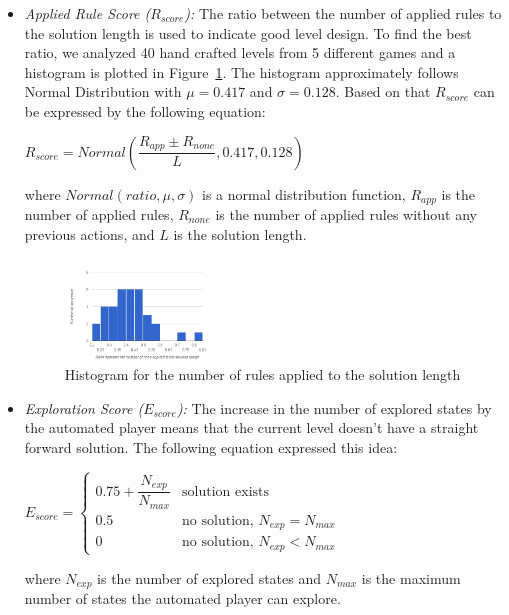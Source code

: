 \documentclass[letterpaper]{article}
\newcommand{\figref}[1]{Figure~\ref{Figure:#1}}
\begin{document}
\begin{itemize}
	\item \emph{Applied Rule Score ($R_{score}$):} The ratio between the number of applied rules to the solution length is used to indicate good level design. To find the best ratio, we analyzed 40 hand crafted levels from 5 different games and a histogram is plotted in \figref{rulesSolutionLengthHistogram}. The histogram approximately follows Normal Distribution with $\mu = 0.417$ and $\sigma = 0.128$. Based on that $R_{score}$ can be expressed by the following equation:
	\begin{center}$R_{score} = Normal(\dfrac{R_{app} \pm R_{none}}{L}, 0.417, 0.128)$\end{center}
	where $Normal(ratio, \mu, \sigma)$ is a normal distribution function, $R_{app}$ is the number of applied rules, $R_{none}$ is the number of applied rules without any previous actions, and $L$ is the solution length.
	\begin{figure}[ht]
		\centering
		\includegraphics[width=0.4\textwidth]{Images/rulesSolutionLengthHistogram}
		\caption{Histogram for the number of rules applied to the solution length}
		\label{Figure:rulesSolutionLengthHistogram}
	\end{figure}
	
	\item \emph{Exploration Score ($E_{score}$):} The increase in the number of explored states by the automated player means that the current level doesn't have a straight forward solution. The following equation expressed this idea:
	\begin{center}
	$E_{score}= \begin{cases}
	               0.75 + \dfrac{N_{exp}}{N_{max}} & \text{solution exists}\\
	               0.5 & \text{no solution, }N_{exp} = N_{max}\\
	               0 & \text{no solution, }N_{exp} < N_{max}
	           \end{cases}$
	\end{center}
	where $N_{exp}$ is the number of explored states and $N_{max}$ is the maximum number of states the automated player can explore.
\end{itemize}
\end{document}
